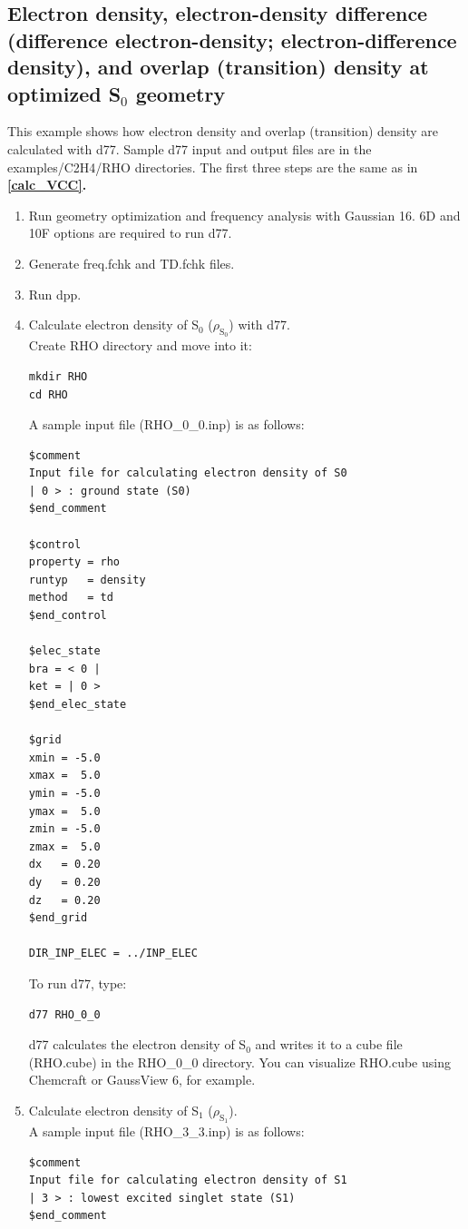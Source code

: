 ﻿\documentclass[11pt,a4paper,openany]{article}
\begin{document}
\subsection{Electron density, electron-density difference (difference electron-density; electron-difference density), and overlap (transition) density at optimized S$_0$ geometry}\label{calc_RHO}
This example shows how electron density and overlap (transition) density are calculated with d77. 
Sample d77 input and output files are in the examples/C2H4/RHO directories. The first three steps are the same as in \bf{\ref{calc_VCC}}\rm{.}

\begin{enumerate}

\item{
Run geometry optimization and frequency analysis with Gaussian 16. 
6D and 10F options are required to run d77.
}
\item{Generate freq.fchk and TD.fchk files.}
\item{Run dpp.}

\item{
Calculate electron density of S$_0$ ($\rho_{\mathrm{S}_0}$) with d77.\\
Create RHO directory and move into it:
\begin{verbatim}
mkdir RHO
cd RHO
\end{verbatim} 
A sample input file (RHO\_0\_0.inp) is as follows:
\begin{verbatim}
$comment
Input file for calculating electron density of S0
| 0 > : ground state (S0)
$end_comment

$control
property = rho
runtyp   = density
method   = td
$end_control

$elec_state
bra = < 0 |
ket = | 0 >
$end_elec_state

$grid
xmin = -5.0
xmax =  5.0
ymin = -5.0
ymax =  5.0
zmin = -5.0
zmax =  5.0
dx   = 0.20
dy   = 0.20
dz   = 0.20
$end_grid

DIR_INP_ELEC = ../INP_ELEC
\end{verbatim}
To run d77, type:
\begin{verbatim} 
d77 RHO_0_0
\end{verbatim}
d77 calculates the electron density of S$_0$ and writes it to a cube file (RHO.cube) in the RHO\_0\_0 directory. You can visualize RHO.cube using Chemcraft\cite{Chemcraft} or GaussView 6,\cite{gv6} for example.
}

\item{
Calculate electron density of S$_1$  ($\rho_{\mathrm{S}_1}$).\\
A sample input file (RHO\_3\_3.inp) is as follows:
\begin{verbatim}
$comment
Input file for calculating electron density of S1
| 3 > : lowest excited singlet state (S1)
$end_comment


\end{verbatim}}
\end{enumerate}
\end{document}

